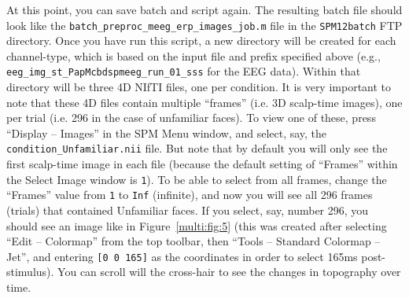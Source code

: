 At this point, you can save batch and script again. The resulting batch file should look like the \texttt{batch\_preproc\_meeg\_erp\_images\_job.m} file in the \texttt{SPM12batch} FTP directory. Once you have run this script, a new directory will be created for each channel-type, which is based on the input file and prefix specified above (e.g., \texttt{eeg\_\-img\_\-st\_\-PapMcbdspmeeg\_\-run\_01\_sss} for the EEG data). Within that directory will be three 4D NIfTI files, one per condition. It is very important to note that these 4D files contain multiple ``frames'' (i.e. 3D scalp-time images), one per trial (i.e. 296 in the case of unfamiliar faces). To view one of these, press ``Display -- Images'' in the SPM Menu window, and select, say, the \texttt{condition\_Unfamiliar.nii} file. But note that by default you will only see the first scalp-time image in each file (because the default setting of ``Frames'' within the Select Image window is \texttt{1}). To be able to select from all frames, change the ``Frames'' value from \texttt{1} to \texttt{Inf} (infinite), and now you will see all 296 frames (trials) that contained Unfamiliar faces. If you select, say, number 296, you should see an image like in Figure~\ref{multi:fig:5} (this was created after selecting ``Edit -- Colormap'' from the top toolbar, then ``Tools -- Standard Colormap -- Jet'', and entering \verb|[0 0 165]| as the coordinates in order to select 165ms post-stimulus). You can scroll will the cross-hair to see the changes in topography over time.

